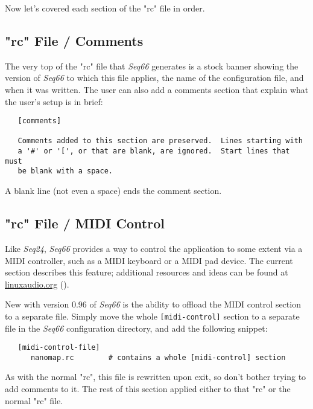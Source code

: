    Now let's covered each section of the "rc" file in order.

\subsection{"rc" File / Comments}
\label{subsec:rc_file_midi_comments}

   The very top of the "rc" file that \textsl{Seq66} generates is a stock
   banner showing the version of \textsl{Seq66} to which this file
   applies, the name of the configuration file, and when it was written.  The
   user can also add a comments section that explain what the user's setup is
   in brief:

   \begin{verbatim}
   [comments]

   Comments added to this section are preserved.  Lines starting with
   a '#' or '[', or that are blank, are ignored.  Start lines that must
   be blank with a space.
   \end{verbatim}

   A blank line (not even a space) ends the comment section.

\subsection{"rc" File / MIDI Control}
\label{subsec:rc_file_midi_control}

   Like \textsl{Seq24}, \textsl{Seq66} provides a way to control the
   application to some extent via a MIDI controller, such as a MIDI keyboard or
   a MIDI pad device.  The current section describes this feature;
   additional resources and ideas can be found at \url{linuxaudio.org}
   (\cite{midicontrol}).

   New with version 0.96 of \textsl{Seq66} is the ability
   to offload the MIDI control section to a separate file.  Simply move
   the whole \texttt{[midi-control]} section to a separate file in
   the \textsl{Seq66} configuration directory, and add the following
   snippet:

   \begin{verbatim}
   [midi-control-file]
      nanomap.rc        # contains a whole [midi-control] section
   \end{verbatim}

   As with the normal "rc", this file is rewritten upon exit, so
   don't bother trying to add comments to it.  The rest of this section
   applied either to that "rc" or the normal "rc" file.

